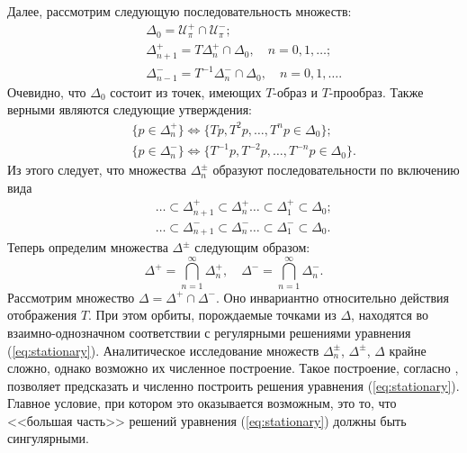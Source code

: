 Далее, рассмотрим следующую последовательность множеств:
%
\begin{eqnarray*}
&& \Delta_0 = \mathcal{U}_{\pi}^+ \cap \mathcal{U}_{\pi}^-; \\
&& \Delta_{n+1}^+ = T \Delta_n^+ \cap \Delta_0, \quad n = 0,1,\dots; \\
&& \Delta_{n-1}^- = T^{-1} \Delta_n^- \cap \Delta_0, \quad n = 0,1,\dots.
\end{eqnarray*}
%
Очевидно, что $\Delta_0$ состоит из точек, имеющих $T$-образ и $T$-прообраз.
Также верными являются следующие утверждения:
%
\begin{eqnarray*}
&& \{ p \in \Delta_n^+ \} \iff \{ Tp, T^2p, \dots, T^np \in \Delta_0 \}; \\
&& \{ p \in \Delta_n^- \} \iff \{ T^{-1}p, T^{-2}p, \dots, T^{-n}p \in \Delta_0 \}.
\end{eqnarray*}
%
Из этого следует, что множества $\Delta_n^{\pm}$ образуют последовательности по включению вида
%
\begin{eqnarray*}
&& \ldots \subset \Delta_{n+1}^+ \subset \Delta_n^+ \ldots \subset \Delta_1^+ \subset \Delta_0; \\
&& \ldots \subset \Delta_{n+1}^- \subset \Delta_n^- \ldots \subset \Delta_1^- \subset \Delta_0.
\end{eqnarray*}
%
Теперь определим множества $\Delta^{\pm}$ следующим образом:
%
\begin{equation*}
\Delta^+ = \bigcap \limits_{n=1}^{\infty} \Delta_n^+, \quad \Delta^- = \bigcap_{n=1}^{\infty} \Delta_n^-.
\end{equation*}
%
Рассмотрим множество $\Delta = \Delta^+ \cap \Delta^-$.
Оно инвариантно относительно действия отображения $T$.
При этом орбиты, порождаемые точками из $\Delta$, находятся во взаимно-однозначном соответствии с регулярными решениями уравнения (\ref{eq:stationary}).
Аналитическое исследование множеств $\Delta_n^{\pm}$, $\Delta^{\pm}$, $\Delta$ крайне сложно, однако возможно их численное построение.
Такое построение, согласно \cite{AlfAvr}, позволяет предсказать и численно построить решения уравнения (\ref{eq:stationary}).
Главное условие, при котором это оказывается возможным, это то, что <<большая часть>> решений уравнения (\ref{eq:stationary}) должны быть сингулярными.


